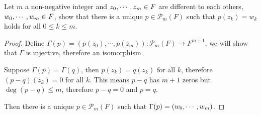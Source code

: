 \documentclass[../main.tex]{subfiles}
\begin{document}
\setcounter{exercise}{6}
\begin{exercise}
  Let $m$ a non-negative integer and $z_0 , \cdots , z_{m} \in F$ are different to each others,
  $w_0 , \cdots , w_{m} \in F$, show that there is a unique $p \in \mathcal{P}_m(F)$
  such that $p(z_k) = w_k$ holds for all $0 \le k \le m$.
\end{exercise}
\begin{proof}
  Define $\Gamma(p) = (p(z_0), \cdots, p(z_m)) : \mathcal{P}_m(F) \rightarrow F^{m + 1}$, we will show that $\Gamma$ is injective,
  therefore an isomorphism.

  Suppose $\Gamma(p) = \Gamma(q)$, then $p(z_k) = q(z_k)$ for all $k$,
  therefore $(p - q)(z_k) = 0$ for all $k$. This means $p - q$ has $m + 1$ zeros
  but $\deg (p - q) \le m$, therefore $p - q = 0$ and $p = q$.

  Then there is a unique $p \in \mathcal{P}_m(F)$ such that $\Gamma(p) = (w_0 , \cdots , w_{m})$.
\end{proof}
\end{document}
